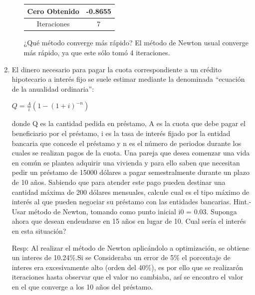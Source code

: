\documentclass{udpreport}
\begin{document}
\begin{enumerate}
\begin{enumerate}
\begin{table}[H]
\begin{tabular} { |c|c|}
        \hline
        Cero Obtenido &  -0.8655\\
        \hline
        Iteraciones   &    7\\
        \hline
        
        \end{tabular}
        \end{table}
        ¿Qué método converge más rápido?
        El método de Newton usual converge más rápido, ya que este sólo tomó 4 iteraciones. %
    \end{enumerate}

\newpage
\item El dinero necesario para pagar la cuota correspondiente a un crédito hipotecario a interés fijo se suele
estimar mediante la denominada “ecuación de la anualidad ordinaria”:
\begin{center}
    $ Q = \frac{A}{i}(1-(1+i)^{-n}) $
\end{center}
donde Q es la cantidad pedida en préstamo, A es la cuota que debe pagar el beneficiario por el
préstamo, i es la tasa de interés fijado por la entidad bancaria que concede el préstamo y n es el
número de periodos durante los cuales se realizan pagos de la cuota.
Una pareja que desea comenzar una vida en común se plantea adquirir una vivienda y para ello saben
que necesitan pedir un préstamo de 15000 dólares a pagar semestralmente durante un plazo de 10 años.
Sabiendo que para atender este pago pueden destinar una cantidad máxima de 200 dólares mensuales,
calcule cual es el tipo máximo de interés al que pueden negociar su préstamo con las entidades bancarias.
Hint.- Usar método de Newton, tomando como punto inicial i0 = 0.03.
Suponga ahora que desean endeudarse en 15 años en lugar de 10. Cual sería el interés en esta situación?


Resp: Al realizar el método de Newton aplicándolo a optimización, se obtiene un interes de 10.24\%.Si se Consideraba un error de 5\% el porcentaje de interes era excesivamente alto (orden del 40\%), es por ello que se realizarón iteraciones hasta observar que el valor no cambiaba, así se encontro el valor en el que converge a los 10 años del préstamo.


\end{enumerate}
\end{document}
